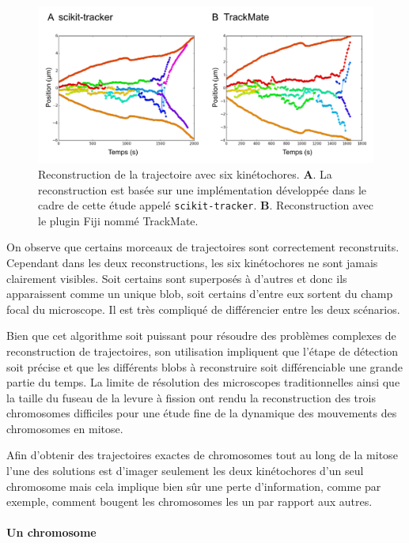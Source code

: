 \documentclass[12pt,a4paper,twoside,openright]{book}
\let\oldparagraph\paragraph
\renewcommand{\paragraph}[1]{\oldparagraph{#1}\mbox{}}
\begin{document}
\begin{figure}[htbp]
\centering
\includegraphics{figures/results/imaging/ndc80.png}
\caption[Reconstruction de la trajectoire avec six kinétochores]{\label{fig:ndc80-reconstruction}Reconstruction
de la trajectoire avec six kinétochores. \textbf{A}. La reconstruction
est basée sur une implémentation développée dans le cadre de cette étude
appelé \texttt{scikit-tracker}. \textbf{B}. Reconstruction avec le
plugin Fiji nommé TrackMate.}
\end{figure}

On observe que certains morceaux de trajectoires sont correctement
reconstruits. Cependant dans les deux reconstructions, les six
kinétochores ne sont jamais clairement visibles. Soit certains sont
superposés à d'autres et donc ils apparaissent comme un unique blob,
soit certains d'entre eux sortent du champ focal du microscope. Il est
très compliqué de différencier entre les deux scénarios.

Bien que cet algorithme soit puissant pour résoudre des problèmes
complexes de reconstruction de trajectoires, son utilisation impliquent
que l'étape de détection soit précise et que les différents blobs à
reconstruire soit différenciable une grande partie du temps. La limite
de résolution des microscopes traditionnelles ainsi que la taille du
fuseau de la levure à fission ont rendu la reconstruction des trois
chromosomes difficiles pour une étude fine de la dynamique des
mouvements des chromosomes en mitose.

Afin d'obtenir des trajectoires exactes de chromosomes tout au long de
la mitose l'une des solutions est d'imager seulement les deux
kinétochores d'un seul chromosome mais cela implique bien sûr une perte
d'information, comme par exemple, comment bougent les chromosomes les un
par rapport aux autres.

\paragraph{Un chromosome}\label{un-chromosome}
\end{document}
